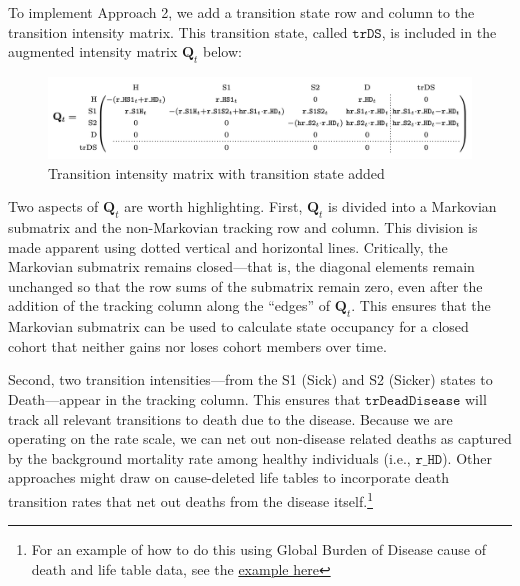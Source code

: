 \documentclass[
]{agujournal2019}
\begin{document}
To implement Approach 2, we add a transition state row and column to the
transition intensity matrix. This transition state, called
\(\texttt{trDS}\), is included in the augmented intensity matrix
\(\mathbf{Q}_t\) below:

\begin{figure}[H]

{\centering \includegraphics{images/Q_model1.png}

}

\caption{Transition intensity matrix with transition state added}

\end{figure}%

Two aspects of \(\mathbf{Q}_t\) are worth highlighting. First,
\(\mathbf{Q}_t\) is divided into a Markovian submatrix and the
non-Markovian tracking row and column. This division is made apparent
using dotted vertical and horizontal lines. Critically, the Markovian
submatrix remains closed---that is, the diagonal elements remain
unchanged so that the row sums of the submatrix remain zero, even after
the addition of the tracking column along the ``edges'' of
\(\mathbf{Q}_t\). This ensures that the Markovian submatrix can be used
to calculate state occupancy for a closed cohort that neither gains nor
loses cohort members over time.

Second, two transition intensities---from the S1 (Sick) and S2 (Sicker)
states to Death---appear in the tracking column. This ensures that
\(\texttt{trDeadDisease}\) will track all relevant transitions to death
due to the disease. Because we are operating on the rate scale, we can
net out non-disease related deaths as captured by the background
mortality rate among healthy individuals (i.e., \(\texttt{r\_HD}\)).
Other approaches might draw on cause-deleted life tables to incorporate
death transition rates that net out deaths from the disease
itself.\footnote{For an example of how to do this using Global Burden of
  Disease cause of death and life table data, see the
  \href{https://graveja0.github.io/vchem-website/blog/posts/modeling-dalys/modeling-dalys.html}{example
  here}}
\end{document}
